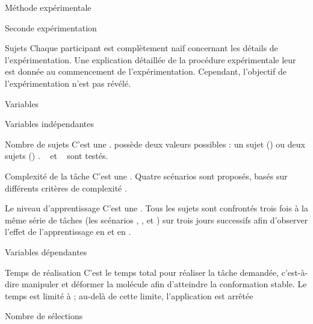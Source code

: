\documentclass[myfrancais,ngerman,english,frenchb]{mythesis}
\begin{document}
\begin{mychapter}{Méthode expérimentale}
\begin{mysection}{Seconde expérimentation}
\begin{mysubsection}{Sujets}
				Chaque participant est complètement naïf concernant les détails de l'expérimentation.
				Une explication détaillée de la procédure expérimentale leur est donnée au commencement de l'expérimentation.
				Cependant, l'objectif de l'expérimentation n'est pas révélé.
			\end{mysubsection}
			\begin{mysubsection}{Variables}
				\begin{mysubsubsection}{Variables indépendantes}
					\begin{myparagraph}{ Nombre de sujets}
						C'est une .
						 possède deux valeurs possibles : \og un sujet (\mycf {}) \fg ou \og deux sujets (\mycf {}) \fg.
						\mynum{12}~ et ~ sont testés.
					\end{myparagraph}
					\begin{myparagraph}{ Complexité de la tâche}
						C'est une .
						Quatre scénarios sont proposés, basés sur différents critères de complexité .
					\end{myparagraph}
					\begin{myparagraph}{ Le niveau d'apprentissage}
						C'est une .
						Tous les sujets sont confrontés trois fois à la même série de tâches (les scénarios , ,  et ) sur trois jours successifs afin d'observer l'effet de l'apprentissage en  et en .
					\end{myparagraph}
				\end{mysubsubsection}
				\begin{mysubsubsection}{Variables dépendantes}
					\begin{myparagraph}{ Temps de réalisation}
						C'est le temps total pour réaliser la tâche demandée, c'est-à-dire manipuler et déformer la molécule afin d'atteindre la conformation stable.
						Le temps est limité à ; au-delà de cette limite, l'application est arrêtée
					\end{myparagraph}
					\begin{myparagraph}{ Nombre de sélections}

\end{myparagraph}
\end{mysubsubsection}
\end{mysubsection}
\end{mysection}
\end{mychapter}
\end{document}
